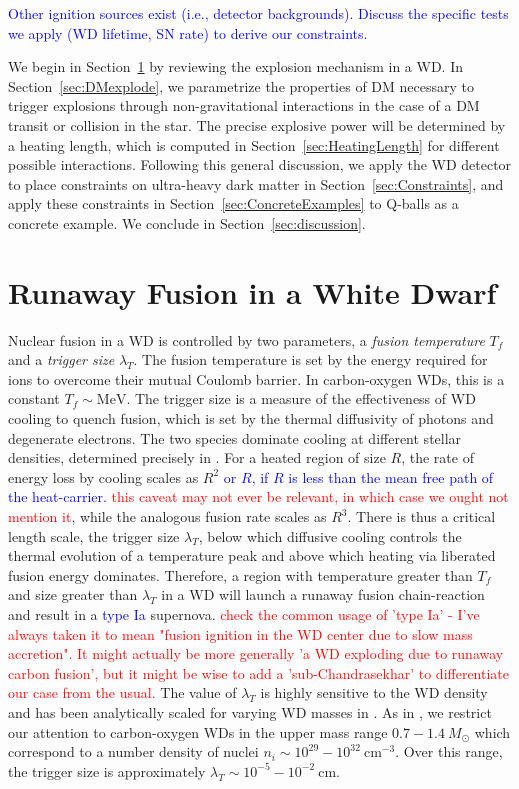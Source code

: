\documentclass[twocolumn,showpacs,preprintnumbers,amsmath,amssymb,prd]{revtex4}
\newcommand{\MeV}{\text{MeV}}
\newcommand{\cm}{\text{cm}}
\begin{document}
\textcolor{blue}{Other ignition sources exist (i.e., detector backgrounds). Discuss the specific tests we apply (WD lifetime, SN rate) to derive our constraints.}

We begin in Section~\ref{sec:Review} by reviewing the explosion mechanism in a WD. In Section~\ref{sec:DMexplode}, we parametrize the properties of DM necessary to trigger explosions through non-gravitational interactions in the case of a DM transit or collision in the star. The precise explosive power will be determined by a heating length, which is computed in Section~\ref{sec:HeatingLength} for different possible interactions. Following this general discussion, we apply the WD detector to place constraints on ultra-heavy dark matter in Section~\ref{sec:Constraints}, and apply these constraints in Section~\ref{sec:ConcreteExamples} to Q-balls as a concrete example. We conclude in Section~\ref{sec:discussion}.

\section{Runaway Fusion in a White Dwarf}
\label{sec:Review}

Nuclear fusion in a WD is controlled by two parameters, a \emph{fusion temperature} $T_f$ and a \emph{trigger size} $\lambda_T$.  The fusion temperature is set by the energy required for ions to overcome their mutual Coulomb barrier.  In carbon-oxygen WDs, this is a constant $T_f \sim \MeV$.  The trigger size is a measure of the effectiveness of WD cooling to quench fusion, which is set by the thermal diffusivity of photons and degenerate electrons. The two species dominate cooling at different stellar densities, determined precisely in \cite{Woosley}. For a heated region of size $R$, the rate of energy loss by cooling scales as $R^{2}$ \textcolor{blue}{or $R$, if $R$ is less than the mean free path of the heat-carrier.} \textcolor{red}{this caveat may not ever be relevant, in which case we ought not mention it}, while the analogous fusion rate scales as $R^{3}$.  There is thus a critical length scale, the trigger size $\lambda_T$, below which diffusive cooling controls the thermal evolution of a temperature peak and above which heating via liberated fusion energy dominates. Therefore, a region with temperature greater than $T_f$ and size greater than $\lambda_T$ in a WD will launch a runaway fusion chain-reaction and result in a \textcolor{blue}{type Ia} supernova. \textcolor{red}{check the common usage of 'type Ia' - I've always taken it to mean "fusion ignition in the WD center due to slow mass accretion".  It might actually be more generally 'a WD exploding due to runaway carbon fusion', but it might be wise to add a 'sub-Chandrasekhar' to differentiate our case from the usual.}  The value of $\lambda_T$ is highly sensitive to the WD density and has been analytically scaled for varying WD masses in \cite{Graham:2015apa}. As in \cite{Graham:2015apa}, we restrict our attention to carbon-oxygen WDs in the upper mass range $0.7 - 1.4 ~M_{\odot}$ which correspond to a number density of nuclei $n_i \sim 10^{29} - 10^{32} ~\cm^{-3}$. Over this range, the trigger size is approximately $\lambda_T \sim 10^{-5} - 10^{-2} ~\text{cm}$.
\end{document}

